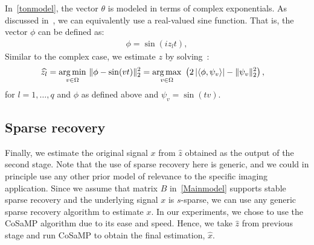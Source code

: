 In~\eqref{tonmodel}, the vector $\theta$ is modeled in terms of complex exponentials. As discussed in~\cite{SoltaniHegde_ICASSP16}, we can equivalently use a real-valued sine function. That is, the vector $\phi$ can be defined as:
\begin{align}
\label{eq:realsine_obs}
\phi = \sin(i z_l t),
\end{align}
Similar to the complex case, we estimate $z$ by solving~\cite{SoltaniHegde_ICASSP16}:
\begin{align*}
\label{OptmSin}
\widehat{z_l} &= \underset{v \in\Omega}{\operatorname*{arg\,min}}~\|\phi - \sin(v t)\|_2^2 = \underset{v \in \Omega}{\operatorname*{arg\,max}}~\left( 2\left|\langle \phi,\psi_{v}\rangle\right| - \|\psi_{v}\|_2^2\right),
\end{align*}
for $l=1,\ldots,q$ and $\phi$ as defined above and $\psi_v =\sin(tv)$. 
	\vspace{-1.2em}%
\subsection{Sparse recovery}
	\vspace{-0.5em}%
Finally, we estimate the original signal $x$ from $\widehat{z}$ obtained as the output of the second stage.
Note that the use of sparse recovery here is generic, and we could in principle use any other prior model of relevance to the specific imaging application. Since we assume that matrix $B$ in~\eqref{Mainmodel} supports stable sparse recovery and the underlying signal $x$ is $s$-sparse, we can use any generic sparse recovery algorithm to estimate $x$. In our experiments, we chose to use the CoSaMP algorithm \cite{cosamp} due to its ease and speed. Hence, we take $\widehat{z}$ from previous stage and run CoSaMP to obtain the final estimation, $\widehat{x}$.



